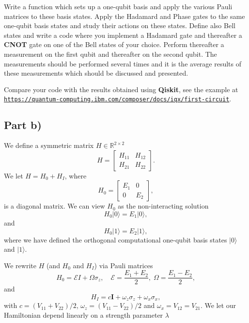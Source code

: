 \documentclass[%
oneside,                 %
final,                   %
10pt]{article}
\begin{document}
Write a function which sets up a one-qubit basis and apply the various
Pauli matrices to these basis states.  Apply the Hadamard and Phase
gates to the same one-qubit basis states and study their actions on
these states. Define also Bell states and write a code where you
implement a Hadamard gate and thereafter a \textbf{CNOT} gate on one of the Bell
states of your choice. Perform thereafter a measurement on the first qubit and
thereafter on the second qubit. The measurements should be performed 
several times and it is the average results of these measurements
which should be discussed and presented.

Compare your code with the results obtained using \textbf{Qiskit}, see the
example at
\href{{https://quantum-computing.ibm.com/composer/docs/iqx/first-circuit}}{\nolinkurl{https://quantum-computing.ibm.com/composer/docs/iqx/first-circuit}}.

\subsection{Part b)}

We define a  symmetric matrix  $H\in {\mathbb{R}}^{2\times 2}$
\[
H = \begin{bmatrix} H_{11} & H_{12} \\ H_{21} & H_{22}
\end{bmatrix}.
\]
We  let $H = H_0 + H_I$, where
\[
H_0= \begin{bmatrix} E_1 & 0 \\ 0 & E_2\end{bmatrix},
\]
is a diagonal matrix. 
We can view $H_0$ as the non-interacting solution
\begin{equation}
       H_0\vert 0 \rangle =E_1\vert 0 \rangle,
\end{equation}
and
\begin{equation}
       H_0\vert 1\rangle =E_2\vert 1\rangle,
\end{equation}
where we have defined the orthogonal computational one-qubit basis states $\vert 0\rangle$ and $\vert 1\rangle$.

We rewrite $H$ (and $H_0$ and $H_I$)  via Pauli matrices
\[
H_0 = \mathcal{E} I + \Omega \sigma_z, \quad \mathcal{E} = \frac{E_1
  + E_2}{2}, \; \Omega = \frac{E_1-E_2}{2},
\]
and
\[
H_I = c \bm{I} +\omega_z\sigma_z + \omega_x\sigma_x,
\]
with $c = (V_{11}+V_{22})/2$, $\omega_z = (V_{11}-V_{22})/2$ and $\omega_x = V_{12}=V_{21}$.
We let our Hamiltonian depend linearly on a strength parameter $\lambda$
\end{document}
